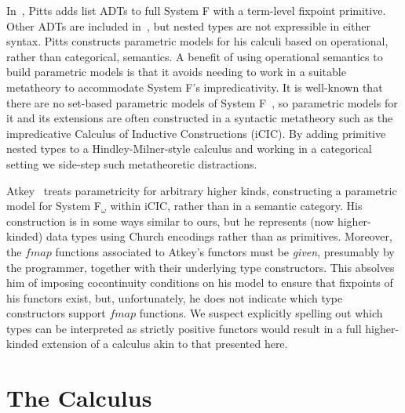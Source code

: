 \documentclass{lmcs}
\theoremstyle{plain}\newtheorem{satz}[thm]{Satz}
\begin{document}
In~\cite{pit00}, Pitts adds list ADTs to full System F with a
term-level fixpoint primitive. Other ADTs are included
in~\cite{pit98}, but nested types are not expressible in either
syntax. Pitts constructs parametric models for his calculi based on
operational, rather than categorical, semantics. A benefit of using
operational semantics to build parametric models is that it avoids
needing to work in a suitable metatheory to accommodate System F's
impredicativity. It is well-known that there are no set-based
parametric models of System F~\cite{rey84}, so parametric models for
it and its extensions are often constructed in a syntactic metatheory
such as the impredicative Calculus of Inductive Constructions (iCIC).
By adding primitive nested types to a Hindley-Milner-style calculus
and working in a categorical setting we side-step such metatheoretic
distractions.

Atkey~\cite{atk12} treats parametricity for arbitrary higher kinds,
constructing a parametric model for System F$_\omega$ within iCIC,
rather than in a semantic category. His construction is in some ways
similar to ours, but he represents (now higher-kinded) data types
using Church encodings rather than as primitives. Moreover, the
$\mathit{fmap}$ functions associated to Atkey's functors must be {\em
  given}, presumably by the programmer, together with their underlying
type constructors. This absolves him of imposing cocontinuity
conditions on his model to ensure that fixpoints of his functors
exist, but, unfortunately, he does not indicate which type
constructors support $\mathit{fmap}$ functions. We suspect explicitly
spelling out which types can be interpreted as strictly positive
functors would result in a full higher-kinded extension of a calculus
akin to that presented here.

\section{The Calculus}\label{sec:calculus}
\end{document}
